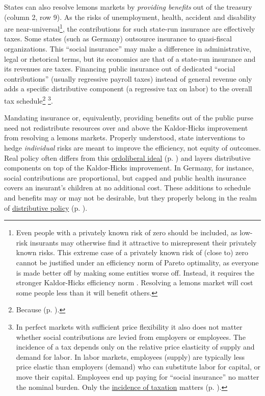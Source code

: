 States can also resolve lemons markets by \emph{providing benefits} out of the treasury (column 2, row 9). As the risks of unemployment, health, accident and disability are near-universal\footnote{
	Even people with a privately known risk of zero should be included, as low-risk insurants may otherwise find it attractive to misrepresent their privately known risks. This extreme case of a privately known risk of (close to) zero cannot be justified under an efficiency norm of Pareto optimality, as everyone is made better off by making some entities worse off. Instead, it requires the stronger Kaldor-Hicks efficiency norm \citep{Kaldor1939,Hicks1939}. Resolving a lemons market will cost some people less than it will benefit others.}, 
the contributions for such state-run insurance are effectively taxes. Some states (such as Germany) outsource insurance to quasi-fiscal organizations. This ``social insurance'' may make a difference in administrative, legal or rhetorical terms, but its economics are that of a state-run insurance and its revenues are taxes. Financing public insurance out of dedicated ``social contributions'' (usually regressive payroll taxes) instead of general revenue only adds a specific distributive component (a regressive tax on labor) to the overall tax schedule\footnote{
	Because  (p. \pageref{sec:redistribution_and_revenue_are_one}).}
\footnote{
	In perfect markets with sufficient price flexibility it also does not matter whether social contributions are levied from employers or employees. The incidence of a tax depends only on the relative price elasticity of supply and demand for labor. In labor markets, employees (supply) are typically less price elastic than employers (demand) who can substitute labor for capital, or move their capital. Employees end up paying for ``social insurance'' no matter the nominal burden. Only the \hyperref[sec:well-determined_incidence]{incidence of taxation} matters (p.  \pageref{sec:well-determined_incidence}).}.
	
Mandating insurance or, equivalently, providing benefits out of the public purse need not redistribute resources over and above the Kaldor-Hicks improvement from resolving a lemons markets. Properly understood, state interventions to hedge \emph{individual} risks are meant to improve the efficiency, not equity of outcomes. Real policy often differs from this \hyperref[sec:ordoliberal_hygiene]{ordoliberal ideal} (p. \pageref{sec:ordoliberal_hygiene}) and layers distributive components on top of the Kaldor-Hicks improvement. In Germany, for instance, social contributions are proportional, but capped and public health insurance covers an insurant's children at no additional cost. These additions to schedule and benefits may or may not be desirable, but they properly belong in the realm of \hyperref[sec:distribution]{distributive policy} (p. \pageref{sec:distribution}).


